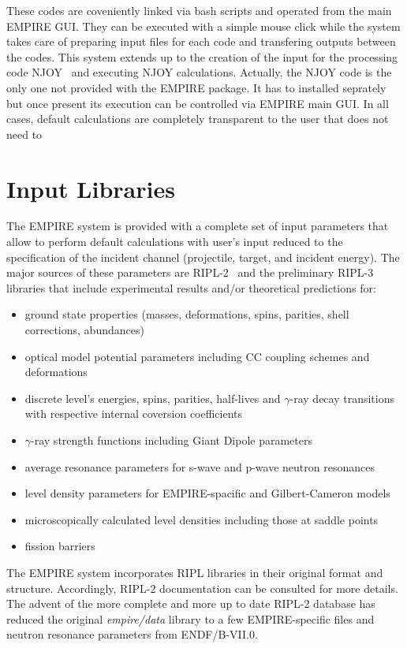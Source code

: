 \documentclass[twocolumn,amsmath,amssymb,10pt,groupedaddress,a4paper]{revtex4}
\begin{document}
These codes are coveniently linked via bash scripts and operated from the main EMPIRE GUI. They can be executed with a simple mouse click while the system takes care of preparing input files for each code and transfering outputs between the codes. This system extends up to the creation of the input for the processing code NJOY~\cite{NJOY} and executing NJOY calculations. Actually, the NJOY code is the only one not provided with the EMPIRE package. It has to installed seprately but once present its execution can be controlled via EMPIRE main GUI. In all cases, default calculations are completely transparent to the user that does not need to

\section{Input Libraries}
The EMPIRE system is provided with a complete set
of input parameters that allow to perform default calculations with user's
input reduced to the specification of the incident channel (projectile, target, and incident energy). The major sources of these parameters are RIPL-2~\cite{RIPL-2} and the preliminary RIPL-3 libraries that include experimental results and/or theoretical predictions for:
\begin{itemize}
\item ground state properties (masses, deformations, spins, parities, shell corrections, abundances)
\item optical model potential parameters including CC coupling schemes and deformations
\item discrete level's energies, spins, parities, half-lives and $\gamma$-ray decay transitions with respective internal coversion coefficients
\item $\gamma$-ray strength functions including Giant Dipole parameters
\item average resonance parameters for s-wave and p-wave neutron resonances
\item level density parameters for EMPIRE-spacific and Gilbert-Cameron models
\item microscopically calculated level densities including those at saddle points
\item fission barriers
\end{itemize}
The EMPIRE system incorporates RIPL libraries in their original format and structure.
Accordingly, RIPL-2 documentation can be consulted for more details.
The advent of the more complete
and more up to date RIPL-2 database has reduced the original \emph{empire/data}
library to a few EMPIRE-specific files and neutron resonance parameters
from ENDF/B-VII.0.
\end{document}

